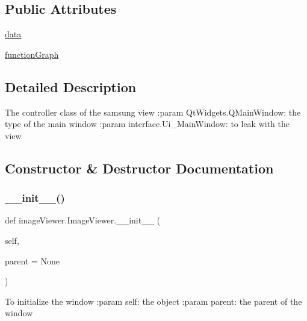 \subsection*{Public Attributes}
\begin{DoxyCompactItemize}
\item 
\hyperlink{classimage_viewer_1_1_image_viewer_a419a3fb29273b2b3c9d6e81539947c36}{data}
\item 
\hyperlink{classimage_viewer_1_1_image_viewer_a74f7996826475b486e3e3139cb4c1b76}{function\+Graph}
\end{DoxyCompactItemize}


\subsection{Detailed Description}
\begin{DoxyVerb}    The controller class of the samsung view
    :param QtWidgets.QMainWindow: the type of the main window
    :param interface.Ui_MainWindow: to leak with the view 
\end{DoxyVerb}
 

\subsection{Constructor \& Destructor Documentation}
\mbox{\label{classimage_viewer_1_1_image_viewer_a4fcb4e2fe09cf05f19b3bc82589a8cbd}} 
\subsubsection{\texorpdfstring{\+\_\+\+\_\+init\+\_\+\+\_\+()}{\_\_init\_\_()}}
{\footnotesize\ttfamily def image\+Viewer.\+Image\+Viewer.\+\_\+\+\_\+init\+\_\+\+\_\+ (\begin{DoxyParamCaption}\item[{}]{self,  }\item[{}]{parent = {\ttfamily None} }\end{DoxyParamCaption})}

\begin{DoxyVerb}    To initialize the window
    :param self: the object
    :param parent: the parent of the window
\end{DoxyVerb}
 


